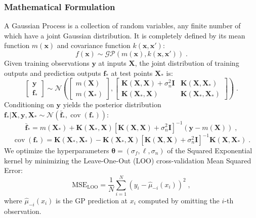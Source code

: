 \documentclass{ol-softwaremanual}
\begin{document}
\subsubsection{Mathematical Formulation}
A Gaussian Process is a collection of random variables, any finite number of which have a joint Gaussian distribution. It is completely defined by its mean function $m(\mathbf{x})$ and covariance function $k(\mathbf{x}, \mathbf{x}')$:
\begin{equation}
    f(\mathbf{x}) \sim \mathcal{GP}\left(m(\mathbf{x}), k(\mathbf{x}, \mathbf{x}')\right) \;.
\end{equation}
Given training observations $\mathbf{y}$ at inputs $\mathbf{X}$, the joint distribution of training outputs and prediction outputs $\mathbf{f}_*$ at test points $\mathbf{X}_*$ is:
\begin{equation}
    \begin{bmatrix} \mathbf{y} \\ \mathbf{f}_* \end{bmatrix} \sim \mathcal{N}\left( \begin{bmatrix} m(\mathbf{X}) \\ m(\mathbf{X}_*) \end{bmatrix}, \begin{bmatrix} \mathbf{K}(\mathbf{X}, \mathbf{X}) + \sigma_n^2 \mathbf{I} & \mathbf{K}(\mathbf{X}, \mathbf{X}_*) \\ \mathbf{K}(\mathbf{X}_*, \mathbf{X}) & \mathbf{K}(\mathbf{X}_*, \mathbf{X}_*) \end{bmatrix} \right) \;.
\end{equation}
Conditioning on $\mathbf{y}$ yields the posterior distribution $\mathbf{f}_* | \mathbf{X}, \mathbf{y}, \mathbf{X}_* \sim \mathcal{N}(\bar{\mathbf{f}}_*, \operatorname{cov}(\mathbf{f}_*))$:
\begin{equation}
    \bar{\mathbf{f}}_* = m(\mathbf{X}_*) + \mathbf{K}(\mathbf{X}_*, \mathbf{X}) \left[ \mathbf{K}(\mathbf{X}, \mathbf{X}) + \sigma_n^2 \mathbf{I} \right]^{-1} (\mathbf{y} - m(\mathbf{X})) \;,
\end{equation}
\begin{equation}
    \operatorname{cov}(\mathbf{f}_*) = \mathbf{K}(\mathbf{X}_*, \mathbf{X}_*) - \mathbf{K}(\mathbf{X}_*, \mathbf{X}) \left[ \mathbf{K}(\mathbf{X}, \mathbf{X}) + \sigma_n^2 \mathbf{I} \right]^{-1} \mathbf{K}(\mathbf{X}, \mathbf{X}_*) \;.
\end{equation}
We optimize the hyperparameters $\boldsymbol{\theta} = (\sigma_f, \ell, \sigma_n)$ of the Squared Exponential kernel by minimizing the Leave-One-Out (LOO) cross-validation Mean Squared Error:
\begin{equation}
    \text{MSE}_{\text{LOO}} = \frac{1}{N} \sum_{i=1}^N \left( y_i - \hat{\mu}_{-i}(x_i) \right)^2 \;,
\end{equation}
where $\hat{\mu}_{-i}(x_i)$ is the GP prediction at $x_i$ computed by omitting the $i$-th observation.
\end{document}
